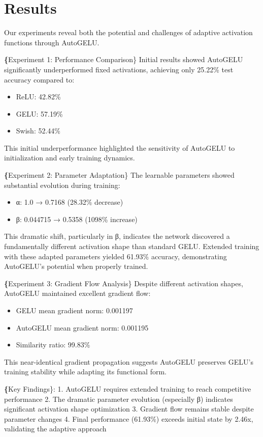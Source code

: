 \documentclass[10pt]{article}
\begin{document}
\section{Results}

Our experiments reveal both the potential and challenges of adaptive activation functions through AutoGELU.

\textbf\{Experiment 1: Performance Comparison\}
Initial results showed AutoGELU significantly underperformed fixed activations, achieving only 25.22\% test accuracy compared to:
\begin{itemize}
\item ReLU: 42.82\%
\item GELU: 57.19\%
\item Swish: 52.44\%
\end{itemize}

This initial underperformance highlighted the sensitivity of AutoGELU to initialization and early training dynamics.

\textbf\{Experiment 2: Parameter Adaptation\}
The learnable parameters showed substantial evolution during training:
\begin{itemize}
\item α: 1.0 → 0.7168 (28.32\% decrease)
\item β: 0.044715 → 0.5358 (1098\% increase)
\end{itemize}

This dramatic shift, particularly in β, indicates the network discovered a fundamentally different activation shape than standard GELU. Extended training with these adapted parameters yielded 61.93\% accuracy, demonstrating AutoGELU's potential when properly trained.

\textbf\{Experiment 3: Gradient Flow Analysis\}
Despite different activation shapes, AutoGELU maintained excellent gradient flow:
\begin{itemize}
\item GELU mean gradient norm: 0.001197
\item AutoGELU mean gradient norm: 0.001195
\item Similarity ratio: 99.83\%
\end{itemize}

This near-identical gradient propagation suggests AutoGELU preserves GELU's training stability while adapting its functional form.

\textbf\{Key Findings\}:
1. AutoGELU requires extended training to reach competitive performance
2. The dramatic parameter evolution (especially β) indicates significant activation shape optimization
3. Gradient flow remains stable despite parameter changes
4. Final performance (61.93\%) exceeds initial state by 2.46x, validating the adaptive approach
\end{document}
